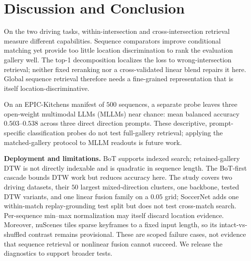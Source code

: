 \documentclass[runningheads]{llncs}
\begin{document}
\section{Discussion and Conclusion}
\label{sec:conclusion}
On the two driving tasks, within-intersection and cross-intersection retrieval measure different
capabilities. Sequence
comparators improve conditional matching yet provide too little location discrimination to rank the
evaluation gallery well. The top-1 decomposition localizes the loss to wrong-intersection retrieval;
neither fixed reranking nor a cross-validated linear blend repairs it here. Global sequence retrieval
therefore needs a fine-grained representation that is itself location-discriminative.

On an EPIC-Kitchens manifest of $500$ sequences, a separate probe leaves three open-weight
multimodal LLMs (MLLMs) near chance: mean balanced accuracy $0.503$--$0.538$ across three direct
direction prompts. These descriptive, prompt-specific classification probes do not test
full-gallery retrieval; applying the matched-gallery protocol to MLLM readouts is future work.

\textbf{Deployment and limitations.} BoT supports indexed search; retained-gallery DTW is not
directly indexable and is quadratic in sequence length. The BoT-first cascade bounds DTW work but
reduces accuracy here. The study covers two driving datasets, their $50$ largest mixed-direction
clusters, one backbone, tested DTW variants, and one linear fusion family on a $0.05$ grid;
SoccerNet adds one within-match replay-grounding test split but does not test cross-match search.
Per-sequence min--max normalization may itself discard location evidence. Moreover, nuScenes tiles
sparse keyframes to a fixed input length, so its intact-vs-shuffled contrast remains provisional.
These are scoped failure cases, not evidence that sequence retrieval or nonlinear fusion cannot
succeed. We release the diagnostics to support broader tests.

\FloatBarrier



\end{document}
